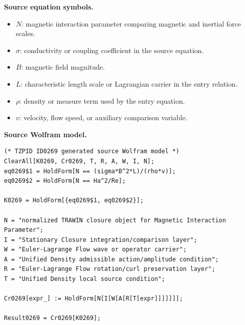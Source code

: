 \begin{minipage}[t]{0.49\linewidth}
\begingroup
\small
\raggedright
\textbf{Source equation symbols.}\par
\begin{itemize}[leftmargin=1.35em,itemsep=1pt,topsep=1pt,parsep=0pt]
    \item $N$: magnetic interaction parameter comparing magnetic and inertial force scales.
    \item $\sigma$: conductivity or coupling coefficient in the source equation.
    \item $B$: magnetic field magnitude.
    \item $L$: characteristic length scale or Lagrangian carrier in the entry relation.
    \item $\rho$: density or measure term used by the entry equation.
    \item $v$: velocity, flow speed, or auxiliary comparison variable.
\end{itemize}
\endgroup
\end{minipage}\hfill
\begin{minipage}[t]{0.47\linewidth}
\begingroup
\scriptsize
\raggedright
\textbf{Source Wolfram model.}\par
\begin{Verbatim}[fontsize=\tiny,breaklines=true,breakanywhere=true]
(* TZPID ID0269 generated source Wolfram model *)
ClearAll[K0269, Cr0269, T, R, A, W, I, N];
eq0269$1 = HoldForm[N == (sigma*B^2*L)/(rho*v)];
eq0269$2 = HoldForm[N == Ha^2/Re];

K0269 = HoldForm[{eq0269$1, eq0269$2}];

N = "normalized TRAWIN closure object for Magnetic Interaction Parameter";
I = "Stationary Closure integration/comparison layer";
W = "Euler-Lagrange Flow wave or operator carrier";
A = "Unified Density admissible action/amplitude condition";
R = "Euler-Lagrange Flow rotation/curl preservation layer";
T = "Unified Density local source condition";

Cr0269[expr_] := HoldForm[N[I[W[A[R[T[expr]]]]]]];

Result0269 = Cr0269[K0269];
\end{Verbatim}
\endgroup
\end{minipage}

